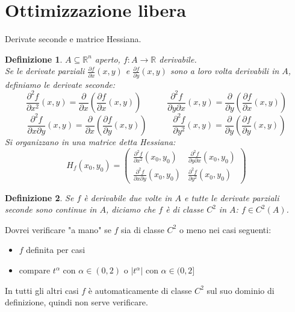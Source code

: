 \documentclass{scrreprt}
\newtheorem{defn}{Definizione}
\newenvironment{definition}{\begin{mdframed}[backgroundcolor=Ivory2]\begin{defn}}{\end{defn}\end{mdframed}}
\begin{document}
\section{Ottimizzazione libera}
Derivate seconde e matrice Hessiana.

\begin{definition}
	$A \subseteq \mathbb{R}^n$ aperto, $f: A \to \mathbb{R}$ derivabile.\\
	Se le derivate parziali $\frac{\partial f}{\partial x} (x,y)$ e $\frac{\partial f}{\partial y} (x,y)$ sono a loro volta derivabili in $A$, definiamo le derivate seconde:
	\begin{equation}
		\frac{\partial^2 f}{\partial x^2} (x,y) = \frac{\partial}{\partial x} \left( \frac{\partial f}{\partial x} (x,y) \right) \quad \quad \quad \frac{\partial^2 f}{\partial y \partial x} (x,y) = \frac{\partial}{\partial y} \left( \frac{\partial f}{\partial x} (x,y) \right)
	\end{equation}
	\begin{equation}
		\frac{\partial^2 f}{\partial x \partial y} (x,y) = \frac{\partial}{\partial x} \left( \frac{\partial f}{\partial y} (x,y) \right) \quad \quad \quad \frac{\partial^2 f}{\partial y^2} (x,y) = \frac{\partial}{\partial y} \left( \frac{\partial f}{\partial y} (x,y) \right)
	\end{equation}
	Si organizzano in una matrice detta Hessiana:
	\begin{equation}
		H_f (x_0, y_0) = \begin{pmatrix}
			\frac{\partial^2 f}{\partial x^2} (x_0, y_0) & \frac{\partial^2 f}{\partial y \partial x} (x_0, y_0) \\
			\frac{\partial^2 f}{\partial x \partial y} (x_0, y_0) & \frac{\partial^2 f}{\partial y^2} (x_0, y_0)
		\end{pmatrix}
	\end{equation}
\end{definition}

\begin{definition}
	Se $f$ è derivabile due volte in $A$ e tutte le derivate parziali seconde sono continue in $A$, diciamo che $f$ è di classe $C^2$ in $A$: $f \in C^2(A)$.
\end{definition}
Dovrei verificare "a mano" se $f$ sia di classe $C^2$ o meno nei casi seguenti:
\begin{itemize}
	\item $f$ definita per casi
	\item compare $t^\alpha$ con $\alpha \in (0,2)$ o $\left\lvert t^\alpha \right\rvert$ con $\alpha \in (0,2]$
\end{itemize}
In tutti gli altri casi $f$ è automaticamente di classe $C^2$ sul suo dominio di definizione, quindi non serve verificare.
\end{document}
